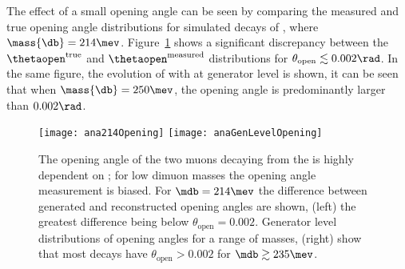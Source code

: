 The effect of a small opening angle can be seen by comparing the measured and true opening angle
distributions for simulated decays of \btokstrdb, where $\mass{\db}=214\mev$.
Figure~\ref{fig:opening:gen} shows a significant discrepancy between the
$\thetaopen^\mathrm{true}$ and $\thetaopen^\mathrm{measured}$
distributions for $\theta_\mathrm{open}\lesssim0.002\rad$.
In the same figure, the evolution of \thetaopen with \mass{\db} at generator level is shown, it can
be seen that when $\mass{\db}=250\mev$, the opening angle is predominantly larger than $0.002\rad$.


\begin{figure}
  \begin{center}
    \texttt{[image: ana214Opening]}
    \texttt{[image: anaGenLevelOpening]}\\
  \end{center}
  \caption{\small
    The opening angle of the two muons decaying from the \db is highly dependent on \mdb; for low
    dimuon masses the opening angle measurement is biased.
    For $\mdb=214\mev$ the difference between generated and reconstructed opening angles are shown,
    (left) the greatest difference being below $\theta_\mathrm{open}=0.002$.
    Generator level distributions of opening angles for a range of masses,
    (right) show that most \db decays have $\theta_\mathrm{open}>0.002$ for
    $\mdb\gtrsim235\mev$.
  }
  \label{fig:opening:gen}
\end{figure}

